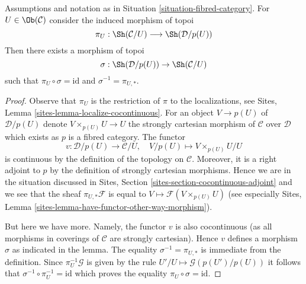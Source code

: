\begin{lemma}
\label{lemma-fibred-category-with-object}
Assumptions and notation as in Situation \ref{situation-fibred-category}.
For $U \in \Ob(\mathcal{C})$ consider the induced morphism
of topoi
$$
\pi_U : \Sh(\mathcal{C}/U) \longrightarrow \Sh(\mathcal{D}/p(U))
$$
Then there exists a morphism of topoi
$$
\sigma : \Sh(\mathcal{D}/p(U)) \to \Sh(\mathcal{C}/U)
$$
such that $\pi_U \circ \sigma = \text{id}$ and $\sigma^{-1} = \pi_{U, *}$.
\end{lemma}

\begin{proof}
Observe that $\pi_U$ is the restriction of $\pi$ to the localizations, see
Sites, Lemma \ref{sites-lemma-localize-cocontinuous}.
For an object $V \to p(U)$ of $\mathcal{D}/p(U)$ denote
$V \times_{p(U)} U \to U$ the strongly cartesian morphism of $\mathcal{C}$
over $\mathcal{D}$ which exists as $p$ is a fibred category.
The functor
$$
v : \mathcal{D}/p(U) \to \mathcal{C}/U,\quad
V/p(U) \mapsto V \times_{p(U)} U/U
$$
is continuous by the definition of the topology on $\mathcal{C}$.
Moreover, it is a right adjoint to $p$ by the definition of strongly
cartesian morphisms. Hence we are in the situation discussed in
Sites, Section \ref{sites-section-cocontinuous-adjoint}
and we see that the sheaf $\pi_{U, *}\mathcal{F}$
is equal to $V \mapsto \mathcal{F}(V \times_{p(U)} U)$
(see especially Sites, Lemma
\ref{sites-lemma-have-functor-other-way-morphism}).

\medskip\noindent
But here we have more. Namely, the functor $v$
is also cocontinuous (as all morphisms in coverings of $\mathcal{C}$ 
are strongly cartesian). Hence $v$ defines a morphism $\sigma$ as
indicated in the lemma. The equality $\sigma^{-1} = \pi_{U, *}$
is immediate from the definition. Since $\pi_U^{-1}\mathcal{G}$
is given by the rule $U'/U \mapsto \mathcal{G}(p(U')/p(U))$
it follows that $\sigma^{-1} \circ \pi_U^{-1} = \text{id}$
which proves the equality
$\pi_U \circ \sigma = \text{id}$.
\end{proof}

